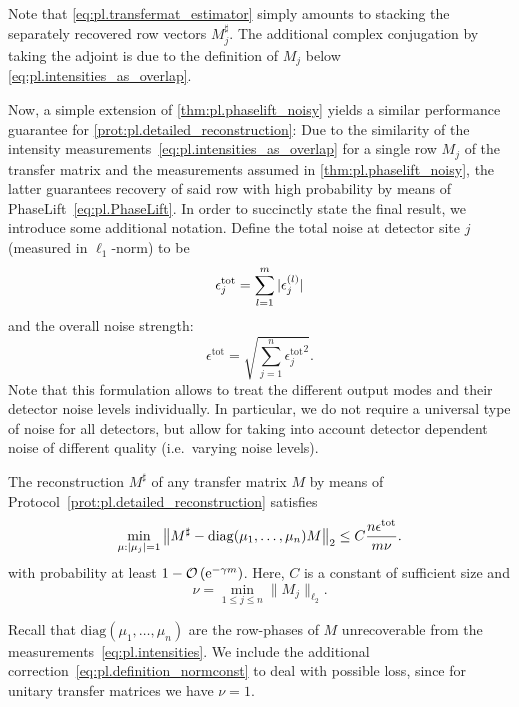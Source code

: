 Note that \cref{eq:pl.transfermat_estimator} simply amounts to stacking the separately recovered row vectors $ M_j^\sharp$.
The additional complex conjugation by taking the adjoint is due to the definition of $ M_j$ below \cref{eq:pl.intensities_as_overlap}.

Now, a simple extension of \cref{thm:pl.phaselift_noisy} yields a similar performance guarantee for \cref{prot:pl.detailed_reconstruction}:
Due to the similarity of the intensity measurements~\eqref{eq:pl.intensities_as_overlap} for a single row $M_j$ of the transfer matrix and the measurements assumed in \cref{thm:pl.phaselift_noisy}, the latter guarantees recovery of said row with high probability by means of PhaseLift~\eqref{eq:pl.PhaseLift}.
In order to succinctly state the final result, we introduce some additional notation.
Define the total noise at detector site $j$ (measured in $\ell_1$-norm) to be
\[
  \epsilon_j^{\mathrm{tot}}= \sum_{l=1}^m {\vert\epsilon_j^{(l)}\vert}
  \label{eq:pl.error_term_summand}
\]
and the overall noise strength:
\[
  \epsilon^{\mathrm{tot}} = \sqrt{ \sum_{j=1}^n {\epsilon_j^{\mathrm{tot}}}^2}.
\]
Note that this formulation allows to treat the different output modes and their detector noise levels individually.
In particular, we do not require a universal type of noise for all detectors, but allow for taking into account detector dependent noise of different quality (i.e.\ varying noise levels).

\begin{corollary}%
  \label{cor:pl.performance_guarantee}
  The reconstruction ${M}^\sharp$ of any transfer matrix ${M}$ by means of Protocol~\ref{prot:pl.detailed_reconstruction} satisfies
    \[
      \min_{{\mu}: {\vert\mu_j\vert} = 1} \left\|  {M}^\sharp -  \mathrm{diag}(\mu_1,\ldots,\mu_n) {M} \right\|_2
      \leq C \frac{n \epsilon^\mathrm{tot}}{m \nu}.
      \label{eq:pl.total_bound}
    \]
  with probability at least $1 - {\mathcal{O}} \left( \mathrm{e}^{-\gamma m}\right)$.
  Here, $C$ is a constant of sufficient size and
  \[
    \nu = \min_{1 \leq j \leq n} \| {M}_j \|_{\ell_2}.
    \label{eq:pl.definition_normconst}
  \]
\end{corollary}
Recall that $\mathrm{diag}(\mu_1, \ldots, \mu_n)$ are the row-phases of ${M}$ unrecoverable from the measurements~\eqref{eq:pl.intensities}.
We include the additional correction~\eqref{eq:pl.definition_normconst} to deal with possible loss, since for unitary transfer matrices we have $\nu = 1$.

